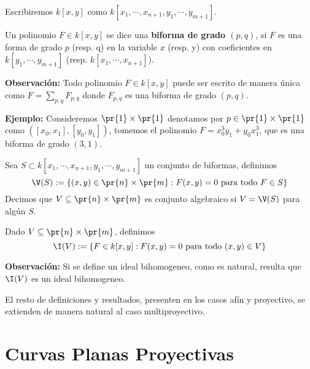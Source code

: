 \documentclass{article}
\begin{document}
\vspace{2mm}
\noindent Escribiremos $k[x,y]$ como $k[x_{1},\cdots,x_{n+1},y_{1},\cdots,y_{m+1}]$.
\begin{dfn}
    Un polinomio $F\in k[x,y]$ se dice una \textbf{biforma de grado $(p,q)$}, si $F$ es una forma 
    de grado $p$ (resp. q) en la variable $x$ (resp. y) con coeficientes en 
    $k[y_{1},\cdots,y_{m+1}]$ (resp. $k[x_{1},\cdots,x_{n+1}]$).
\end{dfn}
\noindent\textbf{Observación:} Todo polinomio $F\in k[x,y]$ puede ser escrito de manera única como
$F=\sum_{p,q}F_{p,q}$ donde $F_{p,q}$ es una biforma de grado $(p,q)$.

\vspace{2mm}
\noindent\textbf{Ejemplo:} Consideremos $\pr{1}\times\pr{1}$ denotamos por $p\in\pr{1}\times\pr{1}$ 
como $([x_{0},x_{1}],[y_{0},y_{1}])$, tomemos el polinomio $F=x_{0}^{3}y_{1}+y_{0}x_{1}^{3}$, que 
es una biforma de grado $(3,1)$.
\begin{dfn}
    Sea $S\subset k[x_{1},\cdots,x_{n+1},y_{1},\cdots,y_{m+1}]$ un conjunto de biformas, definimos
    \begin{equation*}
        \V(S):=\{(x,y)\in\pr{n}\times\pr{m}:F(x,y)=0\text{ para todo }F\in S\}
    \end{equation*}
    Decimos que $V\subseteq\pr{n}\times\pr{m}$ es conjunto algebraico si $V=\V(S)$ para algún $S$.
\end{dfn}
\begin{dfn}
    Dado $V\subseteq\pr{n}\times\pr{m}$, definimos
    \begin{equation*}
        \I(V):=\{F\in k[x,y]:F(x,y)=0\text{ para todo }(x,y)\in V\}
    \end{equation*}
\end{dfn}
\noindent\textbf{Observación:} Si se define un ideal bihomogeneo, como es natural, resulta que 
$\I(V)$ es un ideal bihomogeneo.

\vspace{2mm}
\noindent El resto de definiciones y resultados, presenten en los casos afín y proyectivo, se 
extienden de manera natural al caso multiproyectivo.

\newpage
\section{Curvas Planas Proyectivas}
\end{document}

